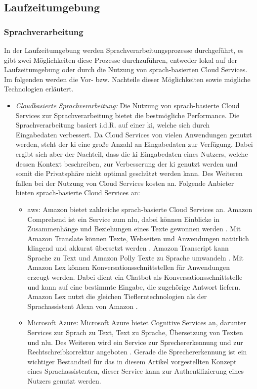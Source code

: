 \subsection{Laufzeitumgebung}
\subsubsection{Sprachverarbeitung}
In der Laufzeitumgebung werden Sprachverarbeitungsprozesse durchgeführt, es gibt zwei Möglichkeiten diese Prozesse durchzuführen, entweder lokal auf der Laufzeitumgebung oder durch die Nutzung von sprach-basierten Cloud Services. Im folgenden werden die Vor- bzw. Nachteile dieser Möglichkeiten sowie mögliche Technologien erläutert.
\begin{itemize}
	\item \textsl{Cloudbasierte Sprachverarbeitung:} Die Nutzung von sprach-basierte Cloud Services zur Sprachverarbeitung bietet die bestmögliche Performance. Die Sprachverarbeitung basiert i.d.R. auf einer \ac{ki}, welche sich durch Eingabedaten verbessert. Da Cloud Services von vielen Anwendungen genutzt werden, steht der \ac{ki} eine große Anzahl an Eingabedaten zur Verfügung. Dabei ergibt sich aber der Nachteil, dass die \ac{ki} Eingabedaten eines Nutzers, welche dessen Kontext beschreiben, zur Verbesserung der \ac{ki} genutzt werden und somit die Privatsphäre nicht optimal geschützt werden kann. Des Weiteren fallen bei der Nutzung von Cloud Services kosten an. Folgende Anbieter bieten sprach-basierte Cloud Services an:
	\begin{itemize}
		\item \ac{aws}: Amazon bietet zahlreiche sprach-basierte Cloud Services an. Amazon Comprehend ist ein Service zum \ac{nlu}, dabei können Einblicke in Zusammenhänge und Beziehungen eines Texte gewonnen werden \cite{AmazonComprehed}. Mit Amazon Translate können Texte, Webseiten und Anwendungen natürlich klingend und akkurat übersetzt werden \cite{AmazonTranslate}. Amazon Transcript kann Sprache zu Text und Amazon Polly Texte zu Sprache umwandeln \cite{AmazonTranscript} \cite{AmazonPolly}. Mit Amazon Lex können Konversationsschnittstellen für Anwendungen erzeugt werden. Dabei dient ein Chatbot als Konversationsschnittstelle und kann auf eine bestimmte Eingabe, die zugehörige Antwort liefern. Amazon Lex nutzt die gleichen Tieflerntechnologien als der Sprachassistent Alexa von Amazon \cite{AmazonLex}.
		\item Microsoft Azure: Microsoft Azure bietet Cognitive Services an, darunter Services zur Sprach zu Text, Text zu Sprache, Übersetzung von Texten und \ac{nlu}. Des Weiteren wird ein Service zur Sprechererkennung und zur Rechtschreibkorrektur angeboten \cite{MicrosoftAzureCognitiveServices}. Gerade die Sprechererkennung ist ein wichtiger Bestandteil für das in diesem Artikel vorgestellten Konzept eines Sprachassistenten, dieser Service kann zur Authentifizierung eines Nutzers genutzt werden. 

\end{itemize}
\end{itemize}

